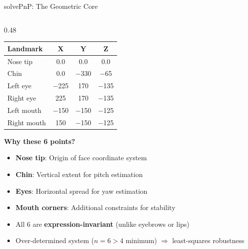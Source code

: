 \documentclass[aspectratio=169,10pt]{beamer}
\begin{document}
\begin{frame}{solvePnP: The Geometric Core}
\begin{columns}[T]
\begin{column}{0.48\textwidth}
\vspace{4pt}
\footnotesize
\begin{tabular}{@{}lccc@{}}
\toprule
\textbf{Landmark} & \textbf{X} & \textbf{Y} & \textbf{Z} \\
\midrule
Nose tip & 0.0 & 0.0 & 0.0 \\
Chin & 0.0 & $-$330 & $-$65 \\
Left eye & $-$225 & 170 & $-$135 \\
Right eye & 225 & 170 & $-$135 \\
Left mouth & $-$150 & $-$150 & $-$125 \\
Right mouth & 150 & $-$150 & $-$125 \\
\bottomrule
\end{tabular}

\vspace{6pt}
\textbf{Why these 6 points?}
\begin{itemize}\scriptsize
  \item \textbf{Nose tip}: Origin of face coordinate system
  \item \textbf{Chin}: Vertical extent for pitch estimation
  \item \textbf{Eyes}: Horizontal spread for yaw estimation
  \item \textbf{Mouth corners}: Additional constraints for stability
  \item All 6 are \textbf{expression-invariant} (unlike eyebrows or lips)
  \item Over-determined system ($n=6 > 4$ minimum) $\Rightarrow$ least-squares robustness
\end{itemize}
\end{column}
\end{columns}
\end{frame}
\end{document}
